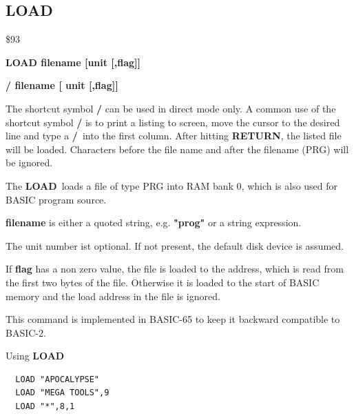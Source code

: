 
\newpage
\subsection{LOAD}
\begin{description}[leftmargin=2cm,style=nextline]
\item [Token:] \$93
\item [Format:] {\bf LOAD filename [unit [,flag]]}
\item [Format:] {\bf / filename [ unit [,flag]]}
\item [Usage:]

   The shortcut symbol {\bf /} can be used in direct mode only.
   A common use of the shortcut symbol {\bf /} is to print
   a listing to screen, move the cursor to the desired line
   and type a {\bf /} into the first column.
   After hitting {\bf RETURN}, the listed file will be loaded.
   Characters before the file name and after the filename (PRG)
   will be ignored.

   The {\bf LOAD} loads a file of type
   PRG into RAM bank 0, which is also used for BASIC program source.

   {\bf filename} is either a quoted string, e.g. {\bf "prog"} or
   a string expression.

   The unit number ist optional.
   If not present, the default disk device is assumed.

   If {\bf flag} has a non zero value, the file is loaded to
   the address, which is read from the first two bytes of the file.
   Otherwise it is loaded to the start of BASIC memory and
   the load address in the file is ignored.

\item [Remarks:]
   This command is implemented in BASIC-65 to keep it backward
   compatible to BASIC-2.

\item [Example:] Using {\bf LOAD}
\begin{tcolorbox}[colback=black,coltext=white]
\verbatimfont{\codefont}
\begin{verbatim}
  LOAD "APOCALYPSE"
  LOAD "MEGA TOOLS",9
  LOAD "*",8,1
\end{verbatim}
\end{tcolorbox}
\end{description}


\newpage
